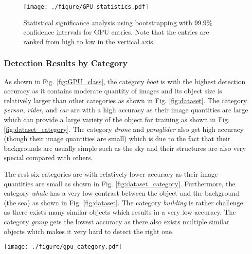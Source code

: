 \documentclass[10pt,journal,compsoc]{IEEEtran}
\begin{document}
\begin{figure}
\centering
  \texttt{[image: ./figure/GPU\_statistics.pdf]}
  \caption{Statistical significance analysis using bootstrapping with 99.9\% confidence intervals for GPU entries. Note that the entries are ranked from high to low in the vertical axis.}
  \label{fig:gpu_statistics}
\end{figure}


\subsubsection{Detection Results by Category}\label{gpu_category}

As shown in Fig. \ref{fig:GPU_class}, the category \textit{boat} is with the highest detection accuracy as it contains moderate quantity of images and its object size is relatively larger than other categories as shown in Fig. \ref{fig:dataset}.
The category \textit{person}, \textit{rider}, and \textit{car} are with a high accuracy as their image quantities are large which can provide a large variety of the object for training as shown in Fig. \ref{fig:dataset_category}.
The category \textit{drone} and \textit{paraglider} also get high accuracy (though their image quantities are small) which is due to the fact that their backgrounds are usually simple such as the sky and their structures are also very special compared with others.

The rest six categories are with relatively lower accuracy as their image quantities are small as shown in Fig. \ref{fig:dataset_category}.
Furthermore, the category \textit{whale} has a very low contrast between the object and the background (the sea) as shown in Fig. \ref{fig:dataset}.
The category \textit{building} is rather challenge as there exists many similar objects which results in a very low accuracy.
The category \textit{group} gets the lowest accuracy as there also exists multiple similar objects which makes it very hard to detect the right one.


\begin{figure*}
\vspace{-6pt}
  \texttt{[image: ./figure/gpu\_category.pdf]}
  \vspace{-20pt}
  \caption{Detection accuracy of GPU entries with respect to image category. Note that the category is sorted in a ranked order and the left-most one is the one with the highest average total score.}
    \vspace{-1pt}
  \label{fig:GPU_class}
  \vspace{-6pt}
\end{figure*}
\end{document}
